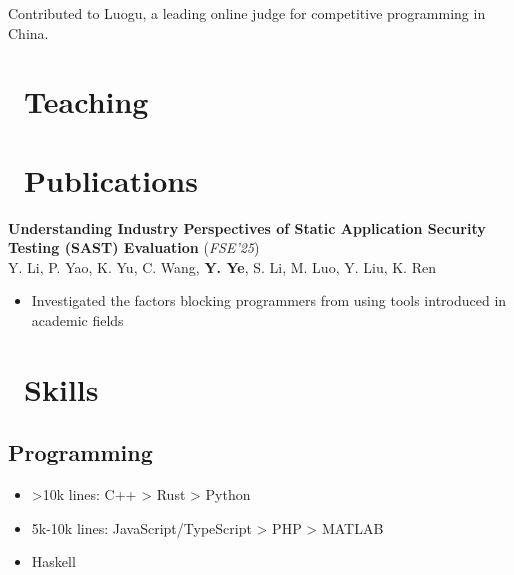 \documentclass{resume}
\begin{document}


Contributed to Luogu, a leading online judge for competitive programming in China.

\section{\faBook\ Teaching}

\section{\faBookmarkO\ Publications}

\textbf{Understanding Industry Perspectives of Static Application Security Testing (SAST) Evaluation} (\textit{FSE'25})\\
Y. Li, P. Yao, K. Yu, C. Wang, \textbf{Y. Ye}, S. Li, M. Luo, Y. Liu, K. Ren
\begin{itemize}[itemsep=0.5ex]
  \item Investigated the factors blocking programmers from using tools introduced in academic fields
\end{itemize}


\section{\faCogs\ Skills}
\subsection{\textbf{Programming}}
\begin{itemize}[itemsep=0.5ex]
  \item >10k lines: C++ > Rust > Python
  \item 5k-10k lines: JavaScript/TypeScript > PHP > MATLAB
  \item <5k lines: Java > Haskell
\end{itemize}
\end{document}
